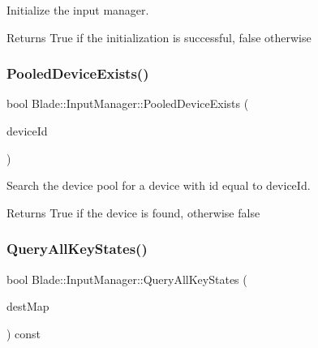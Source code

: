Initialize the input manager. 

\begin{DoxyReturn}{Returns}
True if the initialization is successful, false otherwise 
\end{DoxyReturn}
\mbox{\label{class_blade_1_1_input_manager_ae3ccc72d662ee90161206ef64722380f}} 
\subsubsection{\texorpdfstring{Pooled\+Device\+Exists()}{PooledDeviceExists()}}
{\footnotesize\ttfamily bool Blade\+::\+Input\+Manager\+::\+Pooled\+Device\+Exists (\begin{DoxyParamCaption}\item[{int}]{device\+Id }\end{DoxyParamCaption})}



Search the device pool for a device with id equal to device\+Id. 

\begin{DoxyReturn}{Returns}
True if the device is found, otherwise false 
\end{DoxyReturn}
\mbox{\label{class_blade_1_1_input_manager_a6223ce5641fedc88d8e8591deb73ac90}} 
\subsubsection{\texorpdfstring{Query\+All\+Key\+States()}{QueryAllKeyStates()}}
{\footnotesize\ttfamily bool Blade\+::\+Input\+Manager\+::\+Query\+All\+Key\+States (\begin{DoxyParamCaption}\item[{std\+::map$<$ Virtual\+Key, bool $>$ \&}]{dest\+Map }\end{DoxyParamCaption}) const\hspace{0.3cm}{\ttfamily [noexcept]}}



